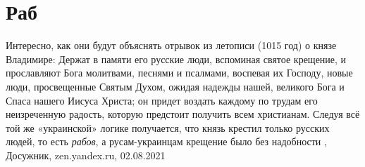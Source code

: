  
 
 
 
 
\chapter{Раб}
\label{sec:slova.rab}

Интересно, как они будут объяснять отрывок из летописи (1015 год) о князе
Владимире: Держат в памяти его русские люди, вспоминая святое крещение, и
прославляют Бога молитвами, песнями и псалмами, воспевая их Господу, новые
люди, просвещенные Святым Духом, ожидая надежды нашей, великого Бога и Спаса
нашего Иисуса Христа; он придет воздать каждому по трудам его неизреченную
радость, которую предстоит получить всем христианам.  Следуя всё той же
«украинской» логике получается, что князь крестил только русских людей, то есть
\emph{рабов}, а русам-украинцам крещение было без надобности
, Досужник, zen.yandex.ru, 02.08.2021
